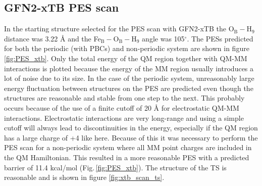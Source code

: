 \subsection{GFN2-xTB PES scan}
In the starting structure selected for the PES scan with GFN2-xTB the O$_{\text{B}}-$H$_{\text{9}}$ distance was 3.22 Å and the Fe$_{\text{B}}-$O$_{\text{B}}-$H$_{\text{9}}$ angle was 105$^{\circ}$. The PESs predicted for both the periodic (with PBCs) and non-periodic system are shown in figure \ref{fig:PES_xtb}. Only the total energy of the QM region together with QM-MM interactions is plotted because the energy of the MM region usually introduces a lot of noise due to its size. In the case of the periodic system, unreasonably large energy fluctuation between structures on the PES are predicted even though the structures are reasonable and stable from one step to the next. This probably occurs because of the use of a finite cutoff of 20 Å for electrostatic QM-MM interactions. Electrostatic interactions are very long-range and using a simple cutoff will always lead to discontinuities in the energy, especially if the QM region has a large charge of +4 like here. Because of this it was necessary to perform the PES scan for a non-periodic system where all MM point charges are included in the QM Hamiltonian. This resulted in a more reasonable PES with a predicted barrier of 11.4 kcal/mol (Fig.\,\ref{fig:PES_xtb}). The structure of the TS is reasonable and is shown in figure \ref{fig:xtb_scan_ts}.

